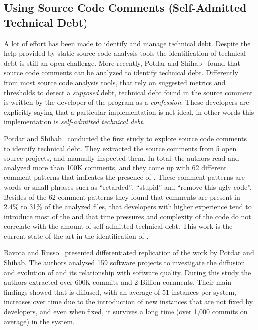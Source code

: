 \subsection{Using Source Code Comments (Self-Admitted Technical Debt)}

A lot of effort has been made to identify and manage technical debt. Despite the help provided by static source code analysis tools the identification of technical debt is still an open challenge. More recently, Potdar and Shihab~\cite{Potdar2014ICSME} found that source code comments can be analyzed to identify technical debt. Differently from most source code analysis tools, that rely on suggested metrics and thresholds to detect a \emph{supposed} debt, technical debt found in the source comment is written by the developer of the program as a \emph{confession}. These developers are explicitly saying that a particular implementation is not ideal, in other words this implementation is \emph{self-admitted technical debt}. 

Potdar and Shihab~\cite{Potdar2014ICSME} conducted the first study to explore source code comments to identify technical debt. They extracted the source comments from 5 open source projects, and manually inspected them. In total, the authors read and analyzed more than 100K comments, and they come up with 62 different comment patterns that indicates the presence of \SATD. These comment patterns are words or small phrases such as ``retarded'', ``stupid'' and ``remove this ugly code''. Besides of the 62 comment patterns they found that \SATD comments are present in 2.4\% to 31\% of the analyzed files, that developers with higher experience tend to introduce most of the \SATD and that time pressures and complexity of the code do not correlate with the amount of self-admitted technical debt. This work is the current state-of-the-art in the identification of \SATD. 

Bavota and Russo~\cite{bavota2016MSR} presented differentiated replication of the work by Potdar and Shihab. The authors analyzed 159 software projects to investigate the diffusion and evolution of \SATD and its relationship with software quality. During this study the authors extracted over 600K commits and 2 Billion comments. Their main findings showed that \SATD is diffused, with an average of 51 instances per system, increases over time due to the introduction of new instances that are not fixed by developers, and even when fixed, it survives a long time (over 1,000 commits on average) in the system.

